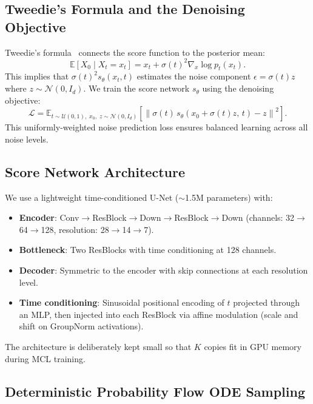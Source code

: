\documentclass[11pt,a4paper]{article}
\newcommand{\E}{\mathbb{E}}
\newcommand{\N}{\mathcal{N}}
\newcommand{\Id}{I_d}
\begin{document}
\subsection{Tweedie's Formula and the Denoising Objective}

Tweedie's formula~\cite{efron2011tweedies} connects the score function to
the posterior mean:
\begin{equation}
  \E[X_0 \mid X_t = x_t] = x_t + \sigma(t)^2 \nabla_x \log p_t(x_t).
  \label{eq:tweedie}
\end{equation}
This implies that $\sigma(t)^2 s_\theta(x_t, t)$ estimates the noise
component $\epsilon = \sigma(t) z$ where $z \sim \N(0, \Id)$. We train
the score network $s_\theta$ using the denoising objective:
\begin{equation}
  \mathcal{L} = \E_{t \sim \mathcal{U}(0,1),\; x_0,\; z \sim \N(0,\Id)}
  \left[\left\|\sigma(t)\, s_\theta(x_0 + \sigma(t) z,\, t) - z\right\|^2\right].
  \label{eq:loss}
\end{equation}
This uniformly-weighted noise prediction loss ensures balanced learning
across all noise levels.

\subsection{Score Network Architecture}

We use a lightweight time-conditioned U-Net ($\sim$1.5M parameters) with:
\begin{itemize}[nosep]
  \item \textbf{Encoder}: Conv$\to$ResBlock$\to$Down$\to$ResBlock$\to$Down
    (channels: 32$\to$64$\to$128, resolution: 28$\to$14$\to$7).
  \item \textbf{Bottleneck}: Two ResBlocks with time conditioning at
    128 channels.
  \item \textbf{Decoder}: Symmetric to the encoder with skip connections at
    each resolution level.
  \item \textbf{Time conditioning}: Sinusoidal positional encoding of
    $t$ projected through an MLP, then injected into each ResBlock via
    affine modulation (scale and shift on GroupNorm activations).
\end{itemize}
The architecture is deliberately kept small so that $K$ copies fit in GPU
memory during MCL training.

\subsection{Deterministic Probability Flow ODE Sampling}
\end{document}
